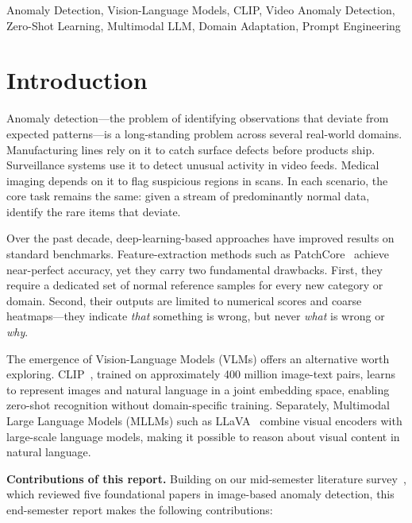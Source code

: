 \documentclass[conference]{IEEEtran}
\begin{document}
\begin{IEEEkeywords}
Anomaly Detection, Vision-Language Models, CLIP, Video Anomaly Detection, Zero-Shot Learning, Multimodal LLM, Domain Adaptation, Prompt Engineering
\end{IEEEkeywords}

\section{Introduction}

Anomaly detection---the problem of identifying observations that deviate from expected patterns---is a long-standing problem across several real-world domains. Manufacturing lines rely on it to catch surface defects before products ship. Surveillance systems use it to detect unusual activity in video feeds. Medical imaging depends on it to flag suspicious regions in scans. In each scenario, the core task remains the same: given a stream of predominantly normal data, identify the rare items that deviate.

Over the past decade, deep-learning-based approaches have improved results on standard benchmarks. Feature-extraction methods such as PatchCore~\cite{roth2022patchcore} achieve near-perfect accuracy, yet they carry two fundamental drawbacks. First, they require a dedicated set of normal reference samples for every new category or domain. Second, their outputs are limited to numerical scores and coarse heatmaps---they indicate \textit{that} something is wrong, but never \textit{what} is wrong or \textit{why}.

The emergence of Vision-Language Models (VLMs) offers an alternative worth exploring. CLIP~\cite{radford2021clip}, trained on approximately 400 million image-text pairs, learns to represent images and natural language in a joint embedding space, enabling zero-shot recognition without domain-specific training. Separately, Multimodal Large Language Models (MLLMs) such as LLaVA~\cite{liu2023llava} combine visual encoders with large-scale language models, making it possible to reason about visual content in natural language.

\textbf{Contributions of this report.} Building on our mid-semester literature survey~\cite{sarangi2026midsem}, which reviewed five foundational papers in image-based anomaly detection, this end-semester report makes the following contributions:
\end{document}
